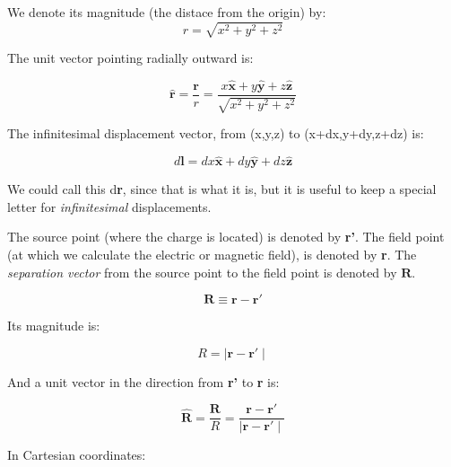 \documentclass[a4paper,12pt]{article}
\begin{document}
We denote its magnitude (the distace from the origin) by:
\[r=\sqrt{x^2+y^2+z^2}\]

The unit vector pointing radially outward is:

\[\mathbf{\hat{r}}=\frac{\textbf{r}}{r}=\frac{x\mathbf{\hat{x}}+y\mathbf{\hat{y}}+z\mathbf{\hat{z}}}{\sqrt{x^2+y^2+z^2}}\]

The infinitesimal displacement vector, from (x,y,z) to (x+dx,y+dy,z+dz) is:

\[d\mathbf{l}=dx\mathbf{\hat{x}}+dy\mathbf{\hat{y}}+dz\mathbf{\hat{z}}\]

We could call this d\textbf{r}, since that is what it is, but it is useful to keep a special letter for \emph{infinitesimal} displacements.

The source point (where the charge is located) is denoted by \textbf{r'}. The field point (at which we calculate the electric or magnetic field), is denoted by \textbf{r}. The \emph{separation vector} from the source point to the field point is denoted by $\mathbf{R}$.

\[\mathbf{R} \equiv \mathbf{r}-\mathbf{r'}\]

Its magnitude is:

\[R=\mid\mathbf{r}-\mathbf{r'}\mid\]

And a unit vector in the direction from \textbf{r'} to \textbf{r} is:

\[\mathbf{\hat{R}}=\frac{\mathbf{R}}{R}=\frac{\mathbf{r}-\mathbf{r'}}{\mid\mathbf{r}-\mathbf{r'}\mid}\]

In Cartesian coordinates:
\end{document}
